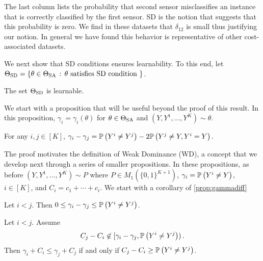 The last column lists the probability that second sensor misclassifies an instance that is correctly classified by the first sensor. SD is the notion that suggests that this probability is zero. We find in these datasets that $\delta_{12}$ is small thus justifying our notion. In general we have found this behavior is representative of other cost-associated datasets. %



We next show that SD conditions ensures learnability. To this end,
let $\Theta_{\mathrm{SD}} = \{ \theta\in \Theta_{\mathrm{SA}}\,:\, \theta \text{ satisfies SD condition } \}$.

\begin{thm}
\label{thm:tsdlearnable}
The set $\Theta_{\mathrm{SD}}$ is learnable.
\end{thm}
We start with a proposition that will be useful beyond the proof of this result.
In this proposition, $\gamma_i = \gamma_i(\theta)$ for $\theta \in \Theta_{\mathrm{SA}}$ and $(Y,Y^1,\dots,Y^K) \sim \theta$.
\begin{prop}\label{prop:gammadiff}
For any $i,j\in [K]$, $\gamma_i - \gamma_j = \mathbb{P}\left(Y^i\ne Y^j\right) - 2\mathbb{P}\left( Y^j \ne Y, Y^i=Y\right)$.
\end{prop}

The proof motivates the definition of Weak Dominance (WD), a concept that we develop next through a series of smaller
propositions. In these propositions, as before $(Y,Y^1,\dots,Y^K) \sim P$ where $P\in M_1(\{0,1\}^{K+1})$,
 $\gamma_i = \mathbb{P}\left(Y^i \ne Y\right)$, $i\in [K]$, and $C_i = c_1 + \cdots + c_i$.
We start with a corollary of \cref{prop:gammadiff}
\begin{cor}
\label{cor:gammadiff}
Let $i<j$. Then $0\le \gamma_i -\gamma_j \le \mathbb{P}\left(Y^i\ne Y^j\right)$.
\end{cor}
\begin{prop}
\label{prop:ilej}
Let $i<j$. Assume 
\begin{align}
\label{eq:cond1}
C_j - C_i \not\in [\gamma_i - \gamma_j, \mathbb{P}\left(Y^i\ne Y^j\right) )\,.
\end{align}
Then $\gamma_i + C_i \le \gamma_j + C_j$ if and only if $C_j - C_i \ge \mathbb{P}\left(Y^i\ne Y^j\right)$.
\end{prop}

